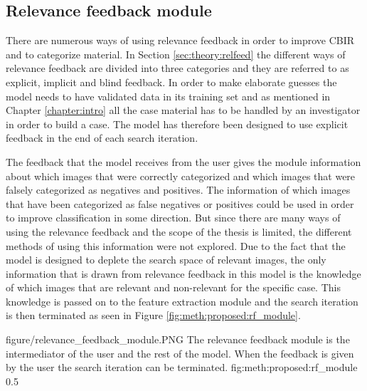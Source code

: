 
\subsection{Relevance feedback module}
\label{sec:method:proposed:rf}
There are numerous ways of using relevance feedback in order to improve CBIR and to categorize material. In Section \ref{sec:theory:relfeed} the different ways of relevance feedback are divided into three categories and they are referred to as explicit, implicit and blind feedback. 
In order to make elaborate guesses the model needs to have validated data in its training set and as mentioned in Chapter \ref{chapter:intro} all the case material has to be handled by an investigator in order to build a case. The model has therefore been designed to use explicit feedback in the end of each search iteration.

The feedback that the model receives from the user gives the module information about which images that were correctly categorized and which images that were falsely categorized as negatives and positives. The information of which images that have been categorized as false negatives or positives could be used in order to improve classification in some direction. But since there are many ways of using the relevance feedback and the scope of the thesis is limited, the different methods of using this information were not explored. Due to the fact that the model is designed to deplete the search space of relevant images, the only information that is drawn from relevance feedback in this model is the knowledge of which images that are relevant and non-relevant for the specific case. This knowledge is passed on to the feature extraction module and the search iteration is then terminated as seen in Figure \ref{fig:meth:proposed:rf_module}.

\singlefigurenear
{figure/relevance_feedback_module.PNG}
{The relevance feedback module is the intermediator of the user and the rest of the model. When the feedback is given by the user the search iteration can be terminated.}
{fig:meth:proposed:rf_module}
{0.5}

